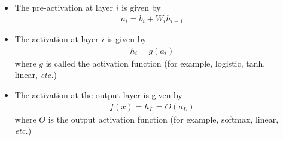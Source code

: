 \begin{frame}
  \begin{columns}
    \begin{overlayarea}{\textwidth}{\textheight}
      \makebox[\textwidth][c]{\usebox{\nncontent}}
    \end{overlayarea}

    \begin{overlayarea}{\textwidth}{\textheight}
      \begin{itemize}
        \justifying
        \item The pre-activation at layer $i$ is given by
            \begin{align*}
              a_i = b_i + W_i h_{i-1}
            \end{align*}
        \item The activation at layer $i$ is given by
            \begin{align*}
              h_i = g(a_i)
            \end{align*}
            where $g$ is called the activation function (for example, logistic, tanh, linear, \textit{etc.})
        \item The activation at the output layer is given by
            \begin{align*}
              f(x) = h_{L} = O(a_{L})
            \end{align*}
            where $O$ is the output activation function (for example, softmax, linear, \textit{etc.})
      \end{itemize}
    \end{overlayarea}

  \end{columns}
\end{frame}

